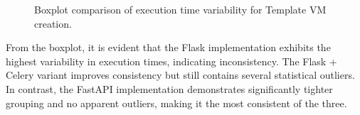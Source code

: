 \begin{figure}[ht]
                \caption{Boxplot comparison of execution time variability for Template VM creation.}
                \label{fig:task1_boxplot}
            \end{figure}

            From the boxplot, it is evident that the Flask implementation exhibits the highest variability in execution 
            times, indicating inconsistency. The Flask + Celery variant improves consistency but still contains several 
            statistical outliers. In contrast, the FastAPI implementation demonstrates significantly tighter grouping and 
            no apparent outliers, making it the most consistent of the three.

